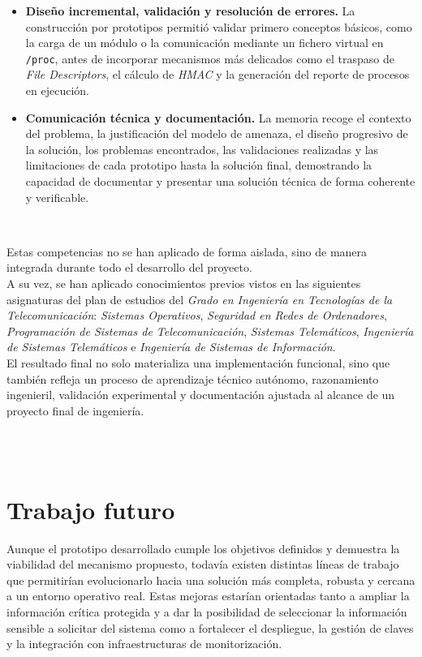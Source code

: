 \begin{itemize}
    \item \textbf{Diseño incremental, validación y resolución de errores.} La construcción por prototipos permitió validar primero conceptos básicos, como la carga de un módulo o la comunicación mediante un fichero virtual en \texttt{/proc}, antes de incorporar mecanismos más delicados como el traspaso de \textit{File Descriptors}, el cálculo de \textit{HMAC} y la generación del reporte de procesos en ejecución.
    
    \item \textbf{Comunicación técnica y documentación.} La memoria recoge el contexto del problema, la justificación del modelo de amenaza, el diseño progresivo de la solución, los problemas encontrados, las validaciones realizadas y las limitaciones de cada prototipo hasta la solución final, demostrando la capacidad de documentar y presentar una solución técnica de forma coherente y verificable.
\end{itemize}

\

Estas competencias no se han aplicado de forma aislada, sino de manera integrada durante todo el desarrollo del proyecto.\\

A su vez, se han aplicado conocimientos previos vistos en las siguientes asignaturas del plan de estudios del \textit{Grado en Ingeniería en Tecnologías de la Telecomunicación}: \textit{Sistemas Operativos}, \textit{Seguridad en Redes de Ordenadores}, \textit{Programación de Sistemas de Telecomunicación}, \textit{Sistemas Telemáticos}, \textit{Ingeniería de Sistemas Telemáticos} e \textit{Ingeniería de Sistemas de Información}.\\

El resultado final no solo materializa una implementación funcional, sino que también refleja un proceso de aprendizaje técnico autónomo, razonamiento ingenieril, validación experimental y documentación ajustada al alcance de un proyecto final de ingeniería.\\

\

\

\section{Trabajo futuro}

Aunque el prototipo desarrollado cumple los objetivos definidos y demuestra la viabilidad del mecanismo propuesto, todavía existen distintas líneas de trabajo que permitirían evolucionarlo hacia una solución más completa, robusta y cercana a un entorno operativo real.
Estas mejoras estarían orientadas tanto a ampliar la información crítica protegida y a dar la posibilidad de seleccionar la información sensible a solicitar del sistema como a fortalecer el despliegue, la gestión de claves y la integración con infraestructuras de monitorización.\\

